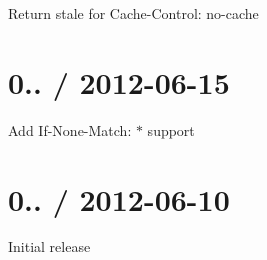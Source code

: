 \begin{DoxyItemize}
\item Return stale for {\ttfamily Cache-\/\+Control\+: no-\/cache}
\end{DoxyItemize}

\section*{0.. / 2012-\/06-\/15 }


\begin{DoxyItemize}
\item Add {\ttfamily If-\/\+None-\/\+Match\+: $\ast$} support
\end{DoxyItemize}

\section*{0.. / 2012-\/06-\/10 }


\begin{DoxyItemize}
\item Initial release 
\end{DoxyItemize}